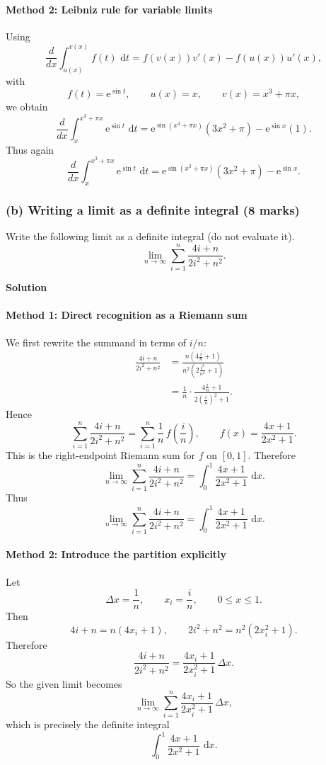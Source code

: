 \documentclass[12pt]{article}
\newcommand{\dd}{\,\mathrm{d}}
\newcommand{\ee}{\mathrm{e}}
\begin{document}
\paragraph{Method 2: Leibniz rule for variable limits}
Using
\[
\frac{d}{dx}\int_{u(x)}^{v(x)} f(t)\,\dd t=f(v(x))v'(x)-f(u(x))u'(x),
\]
with
\[
f(t)=\ee^{\sin t}, \qquad u(x)=x, \qquad v(x)=x^3+\pi x,
\]
we obtain
\[
\frac{d}{dx}\int_{x}^{x^3+\pi x} \ee^{\sin t}\,\dd t
=\ee^{\sin(x^3+\pi x)}(3x^2+\pi)-\ee^{\sin x}(1).
\]
Thus again
\[
\boxed{\frac{d}{dx}\int_{x}^{x^3+\pi x} \ee^{\sin t}\,\dd t
=\ee^{\sin(x^3+\pi x)}(3x^2+\pi)-\ee^{\sin x}.}
\]

\subsubsection{(b) Writing a limit as a definite integral \hfill (8 marks)}

Write the following limit as a definite integral (do not evaluate it).
\[
\lim_{n\to\infty}\sum_{i=1}^{n} \frac{4i+n}{2i^2+n^2}.
\]

\textbf{Solution}

\paragraph{Method 1: Direct recognition as a Riemann sum}
We first rewrite the summand in terms of \(i/n\):
\begin{align*}
\frac{4i+n}{2i^2+n^2}
&=\frac{n\left(4\frac{i}{n}+1\right)}{n^2\left(2\frac{i^2}{n^2}+1\right)} \\
&=\frac{1}{n}\cdot \frac{4\frac{i}{n}+1}{2\left(\frac{i}{n}\right)^2+1}.
\end{align*}
Hence
\[
\sum_{i=1}^{n} \frac{4i+n}{2i^2+n^2}
=\sum_{i=1}^{n} \frac{1}{n}\,f\!\left(\frac{i}{n}\right),
\qquad
f(x)=\frac{4x+1}{2x^2+1}.
\]
This is the right-endpoint Riemann sum for \(f\) on \([0,1]\). Therefore
\[
\lim_{n\to\infty}\sum_{i=1}^{n} \frac{4i+n}{2i^2+n^2}
=\int_{0}^{1} \frac{4x+1}{2x^2+1}\,\dd x.
\]
Thus
\[
\boxed{\lim_{n\to\infty}\sum_{i=1}^{n} \frac{4i+n}{2i^2+n^2}
=\int_{0}^{1} \frac{4x+1}{2x^2+1}\,\dd x.}
\]

\paragraph{Method 2: Introduce the partition explicitly}
Let
\[
\Delta x=\frac{1}{n}, \qquad x_i=\frac{i}{n}, \qquad 0\le x\le 1.
\]
Then
\[
4i+n=n\left(4x_i+1\right),
\qquad
2i^2+n^2=n^2\left(2x_i^2+1\right).
\]
Therefore
\[
\frac{4i+n}{2i^2+n^2}
=\frac{4x_i+1}{2x_i^2+1}\,\Delta x.
\]
So the given limit becomes
\[
\lim_{n\to\infty}\sum_{i=1}^{n}\frac{4x_i+1}{2x_i^2+1}\,\Delta x,
\]
which is precisely the definite integral
\[
\boxed{\int_{0}^{1} \frac{4x+1}{2x^2+1}\,\dd x.}
\]
\end{document}
